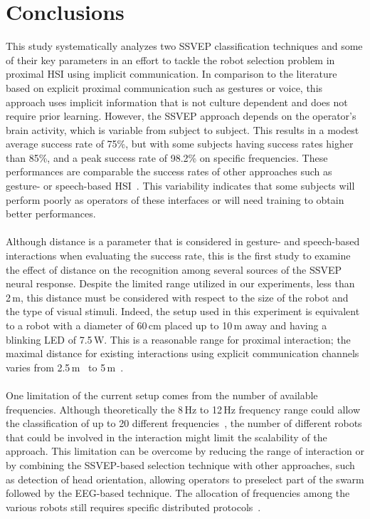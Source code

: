 \documentclass[smallextended]{svjour3}
\begin{document}
\section{Conclusions}
This study systematically analyzes two SSVEP classification techniques and some of their key parameters in an effort to tackle the robot selection problem in proximal HSI using implicit communication. 
In comparison to the literature based on explicit proximal communication such as gestures or voice, this approach uses implicit information that is not culture dependent and does not require prior learning. 
However, the SSVEP approach depends on the operator's brain activity, which is variable from subject to subject. 
This results in a modest average success rate of 75\%, but with some subjects having success rates higher than 85\%, and a peak success rate of 98.2\% on specific frequencies. These performances are comparable the success rates of other approaches such as gesture- or speech-based HSI~\cite{Nagietal2014,Pourmehr2013}. This variability indicates that some subjects will perform poorly as operators of these interfaces or will need training to obtain better performances.\\
\\
Although distance is a parameter that is considered in gesture- and speech-based interactions when evaluating the success rate, this is the first study to examine the effect of distance on the recognition among several sources of the SSVEP neural response.
Despite the limited range utilized in our experiments, less than 2\,m, this distance must be considered with respect to the size of the robot and the type of visual stimuli. 
Indeed, the setup used in this experiment is equivalent to a robot with a diameter of 60\,cm placed up to 10\,m away and having a blinking LED of 7.5\,W. This is a reasonable range for proximal interaction; the maximal distance for existing interactions using explicit communication channels varies from 2.5\,m~\cite{Pourmehr2013} to 5\,m~\cite{Nagietal2014}.\\
\\
One limitation of the current setup comes from the number of available frequencies.
Although theoretically the 8\,Hz to 12\,Hz frequency range could allow the classification of up to 20 different frequencies~\cite{SSVEPfiability}, the number of different robots that could be involved in the interaction might limit the scalability of the approach. This limitation can be overcome by reducing the range of interaction or by combining the SSVEP-based selection technique with other approaches, such as detection of head orientation, allowing operators to preselect part of the swarm followed by the EEG-based technique. The allocation of frequencies among the various robots still requires specific distributed protocols~\cite{mathews2015spatially}.\\
\end{document}
